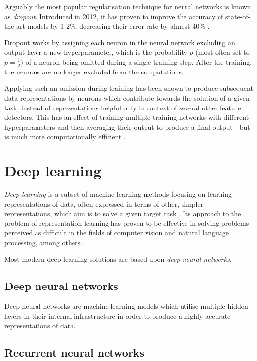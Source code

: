 Arguably the most popular regularisation technique for neural networks is known as \emph{dropout}. Introduced in 2012, it has proven to improve the accuracy of state-of-the-art models by 1-2\%, decreasing their error rate by almost 40\% \cite{handson_geron}.

Dropout works by assigning each neuron in the neural network excluding an output layer a new hyperparameter, which is the probability $p$ (most often set to $p = \frac{1}{2}$) of a neuron being omitted during a single training step. After the training, the neurons are no longer excluded from the computations.

Applying such an omission during training has been shown to produce subsequent data representations by neurons which contribute towards the solution of a given task, instead of representations helpful only in context of several other feature detectors. This has an effect of training multiple training networks with different hyperparameters and then averaging their output to produce a final output - but is much more computationally efficient \cite{dropout}. 

\section{Deep learning}

\emph{Deep learning} is a subset of machine learning methods focusing on learning representations of data, often expressed in terms of other, simpler representations, which aim is to solve a given target task \cite{goodfellow}. Its approach to the problem of representation learning has proven to be effective in solving problems perceived as difficult in the fields of computer vision and natural language processing, among others.


Most modern deep learning solutions are based upon \emph{deep neural networks}.

\subsection{Deep neural networks}

Deep neural networks are machine learning models which utilise multiple hidden layers in their internal infrastructure in order to produce a highly accurate representations of data.

\subsection{Recurrent neural networks}
\label{rnns}

